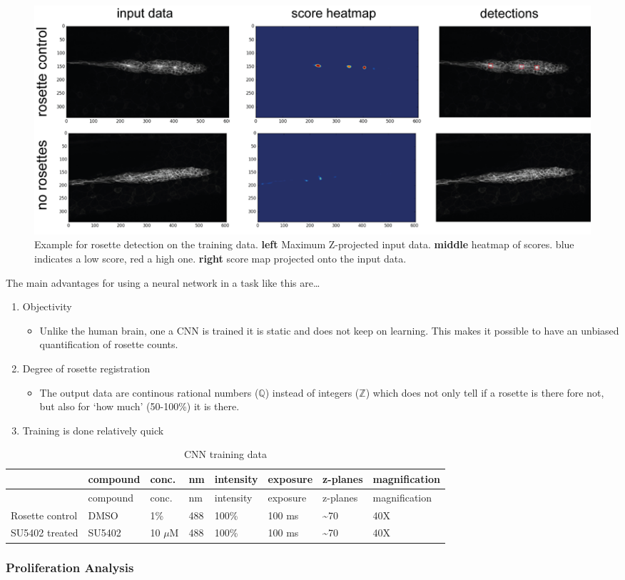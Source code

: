 \documentclass[11pt,singlespacinge,twoside]{reedthesis} %
\providecommand{\tightlist}{%
  \setlength{\itemsep}{0pt}\setlength{\parskip}{0pt}}
\def\labelenumi{\arabic{enumi}.}
\begin{document}
\begin{figure}

{\centering \includegraphics[width=0.75\linewidth]{figure/02-MaMo/CNN/CNNtrain} 

}

\caption[Example for rosette detection on the training data]{Example for rosette detection on the training data. \textbf{left} Maximum Z-projected input data. \textbf{middle} heatmap of scores. blue indicates a low score, red a high one. \textbf{right} score map projected onto the input data.}\label{fig:CNNtrain}
\end{figure}
\noindent The main advantages for using a neural network in a task like this are\ldots{}
\begin{enumerate}
\def\labelenumi{\arabic{enumi}.}
\tightlist
\item
  Objectivity
  \begin{itemize}
  \tightlist
  \item
    Unlike the human brain, one a CNN is trained it is static and does not keep on learning. This makes it possible to have an unbiased quantification of rosette counts.
  \end{itemize}
\item
  Degree of rosette registration
  \begin{itemize}
  \tightlist
  \item
    The output data are continous rational numbers (\(\mathbb{Q}\)) instead of integers (\(\mathbb{Z}\)) which does not only tell if a rosette is there fore not, but also for `how much' (50-100\%) it is there.
  \end{itemize}
\item
  Training is done relatively quick
\end{enumerate}
\begin{longtable}[]{@{}llllllll@{}}
\caption{\label{tab:CNNtraining} CNN training data}\tabularnewline
\toprule
& compound & conc. & nm & intensity & exposure & z-planes & magnification\tabularnewline
\midrule
\endfirsthead
\toprule
& compound & conc. & nm & intensity & exposure & z-planes & magnification\tabularnewline
\midrule
\endhead
Rosette control & DMSO & 1\% & 488 & 100\% & 100 ms & \textasciitilde{}70 & 40X\tabularnewline
SU5402 treated & SU5402 & 10 \(\mu\)M & 488 & 100\% & 100 ms & \textasciitilde{}70 & 40X\tabularnewline
\bottomrule
\end{longtable}
\hypertarget{prolif}{%
\subsubsection{Proliferation Analysis}\label{prolif}}
\end{document}
